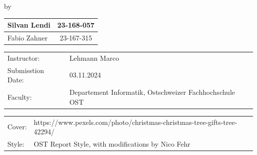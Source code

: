 \begin{titlepage}

\begin{center}

{\makeatletter
\largetitlestyle\fontsize{45}{45}\selectfont\@title
\makeatother}

{\makeatletter
\ifdefvoid{\@subtitle}{}{\bigskip\titlestyle\fontsize{20}{20}\selectfont\@subtitle}
\makeatother}

\bigskip
\bigskip

by

\bigskip
\bigskip

{\makeatletter
\largetitlestyle\fontsize{25}{25}\selectfont\@author 
\makeatother}

\bigskip
\bigskip

\setlength\extrarowheight{2pt}
\begin{tabular}{lc}
    Silvan Lendi & 23-168-057\\\midrule
    Fabio Zahner & 23-167-315 \\
\end{tabular}

\vfill

\begin{tabular}{ll}
    Instructor: & Lehmann Marco \\
    Submisstion Date: & 03.11.2024 \\
    Faculty: & Departement Informatik, Ostschweizer Fachhochschule OST \\
\end{tabular}

\bigskip
\bigskip

\begin{tabular}{p{15mm}p{10cm}}
    Cover: & https://www.pexels.com/photo/christmas-christmas-tree-gifts-tree-42294/ \\
    Style: & OST Report Style, with modifications by Nico Fehr
\end{tabular}


\end{center}

\end{titlepage}
